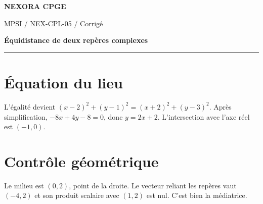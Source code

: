\documentclass[11pt,a4paper]{article}
\begin{document}
{\small\bfseries\color{nexorablue} NEXORA CPGE}\par
{\small MPSI / NEX-CPL-05 / Corrigé}\par
{\LARGE\bfseries Équidistance de deux repères complexes}\par
\vspace{0.25em}\hrule\vspace{0.6em}

\section*{Équation du lieu}
L’égalité devient $(x-2)^2+(y-1)^2=(x+2)^2+(y-3)^2$. Après simplification, $-8x+4y-8=0$, donc $y=2x+2$. L’intersection avec l’axe réel est $(-1,0)$.

\section*{Contrôle géométrique}
Le milieu est $(0,2)$, point de la droite. Le vecteur reliant les repères vaut $(-4,2)$ et son produit scalaire avec $(1,2)$ est nul. C’est bien la médiatrice.
\end{document}
